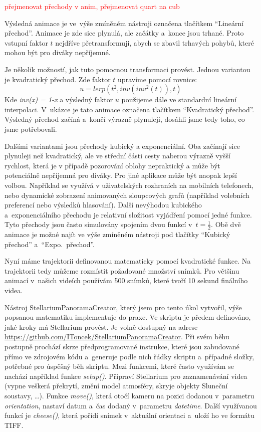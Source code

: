 \documentclass[12pt,a4paper,titlepage]{article}
\begin{document}
\textcolor{red}{přejmenovat přechody v anim, přejmenovat quart na cub}

Výsledná animace je ve~výše zmíněném nástroji označena tlačítkem \enquote{Lineární přechod}. Animace je zde sice plynulá, ale začátky a~konce jsou trhané. Proto vstupní faktor $t$ nejdříve přetransformuji, abych se zbavil trhavých pohybů, které mohou být pro diváky nepříjemné. 

Je několik možností, jak tuto pomocnou transformaci provést. Jednou variantou je kvadratický přechod. Zde faktor $t$ upravíme pomocí rovnice:
\[u = lerp({t}^{2}, inv({inv}^{2}(t)), t)\]
Kde \textit{inv(x) = 1-x} a výsledný faktor $u$ použijeme dále ve standardní lineární interpolaci.  V~ukázce je tato animace označena tlačítkem \enquote{Kvadratický přechod}. Výsledný přechod začíná a~končí výrazně plynuleji, dosáhli jsme tedy toho, co jsme potřebovali. %

Dalšími variantami jsou přechody kubický a exponenciální. Oba začínají sice plynuleji než kvadratický, ale ve střední části cesty naberou výrazně vyšší rychlost, která je v případě pozorování oblohy nepraktický a může být potenciálně nepříjemná pro diváky. Pro jiné aplikace může být naopak lepší volbou. Například se využívá v uživatelských rozhraních na mobilních telefonech, nebo dynamické zobrazení animovaných sloupcových grafů (například volebních preferencí nebo výsledků hlasování). Další nevýhodou kubického a~exponenciálního přechodu je relativní složitost vyjádření pomocí jedné funkce. Tyto přechody jsou často simulovány spojením dvou funkcí v~$t=\frac{1}{2}$. Obě dvě animace je možné najít ve výše zmíněném nástroji pod tlačítky \enquote{Kubický přechod} a~\enquote{Expo.\ přechod}.

Nyní máme trajektorii definovanou matematicky pomocí kvadratické funkce. Na trajektorii tedy můžeme rozmístit požadované množství snímků. Pro většinu animací v~našich videích používám 500 snímků, které tvoří 10 sekund finálního videa.

Nástroj StellariumPanoramaCreator, který jsem pro tento úkol vytvořil, výše popsanou matematiku implementuje do praxe. Ve skriptu je předem definováno, jaké kroky má Stellarium provést. Je volně dostupný na adrese \url{https://github.com/IToncek/StellariumPanoramaCreator}. Při svém běhu postupně prochází skrze předprogramované instrukce, které jsou zabudované přímo ve zdrojovém kódu a~generuje podle nich řádky skriptu a~případné složky, potřebné pro úspěšný běh skriptu. Mezi funkcemi, které často využívám se nachází například funkce \textit{setup()}. Připraví Stellarium pro zaznamenávání videa (vypne veškerá překrytí, změní model atmosféry, skryje objekty Sluneční soustavy, \ldots). Funkce \textit{move()}, která otočí kameru na pozici dodanou v~parametru \textit{orientation}, nastaví datum a~čas dodaný v~parametru \textit{datetime}. Další využívanou funkcí je \textit{cheese()}, která pořídí snímek v~aktuální orientaci a~uloží ho ve formátu TIFF.%
\end{document}
